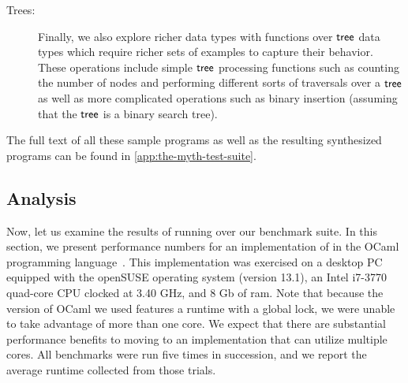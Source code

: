 \begin{description}
  \item[Trees:]
    Finally, we also explore richer data types with functions over $\mathsf{tree}$ data types which require richer sets of examples to capture their behavior.
    These operations include simple $\mathsf{tree}$ processing functions such as counting the number of nodes and performing different sorts of traversals over a $\mathsf{tree}$ as well as more complicated operations such as binary insertion (assuming that the $\mathsf{tree}$ is a binary search tree).
\end{description}

The full text of all these sample \myth{} programs as well as the resulting synthesized programs can be found in \autoref{app:the-myth-test-suite}.

\subsection{Analysis}
\label{subsec:analysis}

Now, let us examine the results of running \myth{} over our benchmark suite.
In this section, we present performance numbers for an implementation of \myth{} in the OCaml programming language~\citep{ocaml-2014}.
This implementation was exercised on a desktop PC equipped with the openSUSE operating system (version 13.1), an Intel i7-3770 quad-core CPU clocked at 3.40 GHz, and 8 Gb of ram.
Note that because the version of OCaml we used features a runtime with a global lock, we were unable to take advantage of more than one core.
We expect that there are substantial performance benefits to moving to an implementation that can utilize multiple cores.
All benchmarks were run five times in succession, and we report the average runtime collected from those trials.



